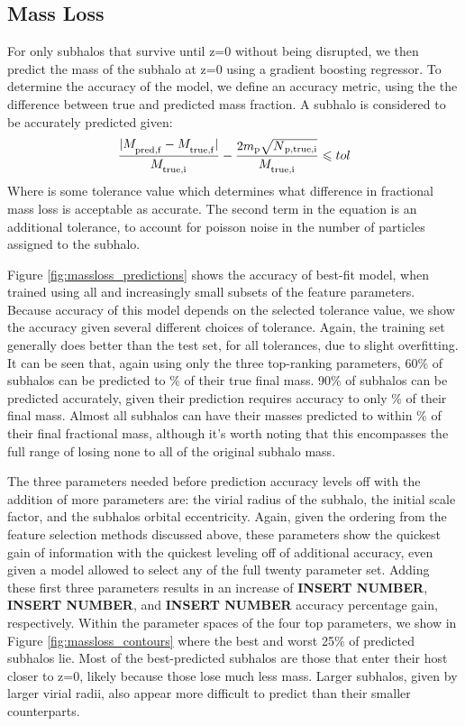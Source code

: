 \documentclass[fleqn,usenatbib]{mnras}
\begin{document}
\subsection{Mass Loss}
\label{sec:mass loss}
For only subhalos that survive until z=0 without being disrupted, we then predict the mass of the subhalo at z=0 using a gradient boosting regressor. To determine the accuracy of the model, we define an accuracy metric, using the the difference between true and predicted mass fraction. A subhalo is considered to be accurately predicted given:
\begin{equation}
    \label{eq:mass loss}
    \frac{|M_\textsubscript{pred,f} - M_\textsubscript{true,f}|}{M_\textsubscript{true,i}} - \frac{2m\textsubscript{p}\sqrt{N\textsubscript{p,true,i}}}{M_\textsubscript{true,i}} \leq tol
\end{equation}
Where  is some tolerance value which determines what difference in fractional mass loss is acceptable as accurate. The second term in the equation is an additional tolerance, to account for poisson noise in the number of particles assigned to the subhalo.

Figure \ref{fig:massloss_predictions} shows the accuracy of best-fit model, when trained using all and increasingly small subsets of the feature parameters. Because accuracy of this model depends on the selected tolerance value, we show the accuracy given several different choices of tolerance. Again, the training set generally does better than the test set, for all tolerances, due to slight  overfitting. It can be seen that, again using only the three top-ranking parameters, 60\% of subhalos can be predicted to \% of their true final mass. 90\% of subhalos can be predicted accurately, given their prediction requires accuracy to only \% of their final mass. Almost all subhalos can have their masses predicted to within \% of their final fractional mass, although it's worth noting that this encompasses the full range of losing none to all of the original subhalo mass. 

The three parameters needed before prediction accuracy levels off with the addition of more parameters are: the virial radius of the subhalo, the initial scale factor, and the subhalos orbital eccentricity. Again, given the ordering from the feature selection methods discussed above, these parameters show the quickest gain of information with the quickest leveling off of additional accuracy, even given a model allowed to select any of the full twenty parameter set. Adding these first three parameters results in an increase of \textbf{INSERT NUMBER}, \textbf{INSERT NUMBER}, and  \textbf{INSERT NUMBER} accuracy percentage gain, respectively. Within the parameter spaces of the four top parameters, we show in Figure \ref{fig:massloss_contours} where the best and worst 25\% of predicted subhalos lie. Most of the best-predicted subhalos are those that enter their host closer to z=0, likely because those lose much less mass. Larger subhalos, given by larger virial radii, also appear more difficult to predict than their smaller counterparts.  
\end{document}
